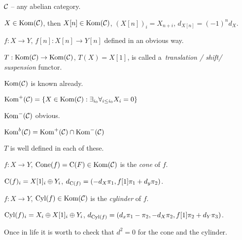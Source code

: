 



	$\mathcal{C}$ -- any abelian category.
	
	\begin{definition}
		$X \in \mathrm{Kom}(\mathcal{C})$, then $X[n] \in \mathrm{Kom}(\mathcal{C})$, $(X[n])_i = X_{n+i}$,
		$d_{X[n]} = (-1)^n d_X$.
		
		$f:X \to Y$, $f[n] : X[n] \to Y[n]$ defined in an obvious way.
		
		$T: \mathrm{Kom}(\mathcal{C}) \to \mathrm{Kom}(\mathcal{C})$, $T(X) = X[1]$, is called
		a~\emph{translation / shift/ suspension} functor.
	\end{definition}
	
	\begin{definition}
		$\mathrm{Kom}(\mathcal{C})$ is known already.
		
		$\mathrm{Kom}^+(\mathcal{C}) = \{ X \in \mathrm{Kom}(\mathcal{C}) : \exists_{i_0} \forall_{i \leq i_0} X_i = 0 \}$
		
		$\mathrm{Kom}^-(\mathcal{C})$ obvious.
		
		$\mathrm{Kom}^b(\mathcal{C}) = \mathrm{Kom}^+(\mathcal{C}) \cap \mathrm{Kom}^-(\mathcal{C})$
	\end{definition}
	
	\begin{remark}
		$T$ is well defined in each of these.
	\end{remark}
	
	\begin{definition}[cone]
		$f: X \to Y$, ${\mathrm{Cone}}(f) = {\mathrm{C}}(F)  \in \mathrm{Kom}(\mathcal{C})$ is the
		\emph{cone} of $f$.
		
		$\mathrm{C}(f)_i = X[1]_i \oplus Y_i$, $d_{\mathrm{C}(f)} = 
		(-d_X \pi_1, f[1] \pi_1 + d_y \pi_2)$.
	\end{definition}
	
	\begin{definition}[cylinder]
		$f:X \to Y$, $\mathrm{Cyl}(f) \in \mathrm{Kom}(\mathcal{C})$ is the \emph{cylinder} of $f$.
		
		$\mathrm{Cyl}(f)_i = X_i \oplus X[1]_i \oplus Y_i$, $d_{\mathrm{Cyl}(f)} =
		(d_x \pi_1 - \pi_2, - d_X \pi_2, f[1] \pi_2 + d_Y \pi_3)$.
	\end{definition}
	
	\begin{remark}
		Once in life it is worth to check that $d^2=0$ for the cone and the cylinder.
	\end{remark}
	
